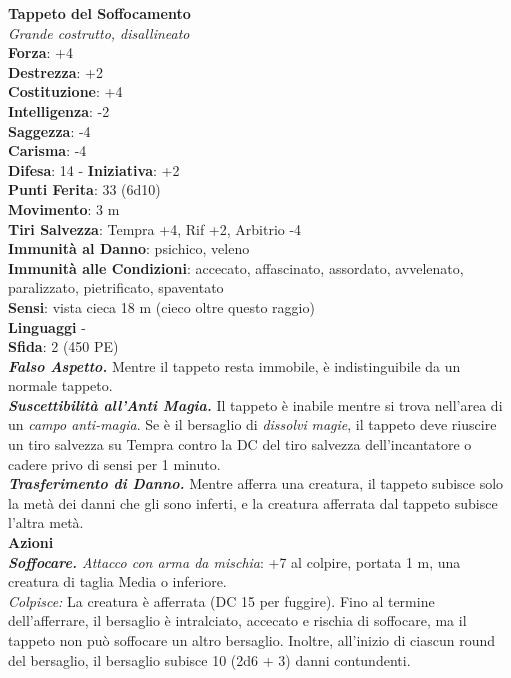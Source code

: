 \begin{multicols}{2}
\medskip\textbf{Tappeto del Soffocamento}\\
\emph{Grande costrutto, disallineato}\\
\textbf{Forza}: +4\\
\textbf{Destrezza}: +2\\
\textbf{Costituzione}: +4\\
\textbf{Intelligenza}: -2\\
\textbf{Saggezza}: -4\\
\textbf{Carisma}: -4\\
\textbf{Difesa}: 14 - \textbf{Iniziativa}: +2\\
\textbf{Punti Ferita}: 33 (6d10)\\
\textbf{Movimento}: 3 m\\
\textbf{Tiri Salvezza}: Tempra +4, Rif +2, Arbitrio -4\\
\textbf{Immunità al Danno}: psichico, veleno\\
\textbf{Immunità alle Condizioni}: accecato, affascinato, assordato, avvelenato, paralizzato, pietrificato, spaventato\\
\textbf{Sensi}: vista cieca 18 m (cieco oltre questo raggio)\\
\textbf{Linguaggi} -\\
\textbf{Sfida}: 2 (450 PE)\smallskip\\
\emph{\textbf{Falso Aspetto.}} Mentre il tappeto resta immobile, è indistinguibile da un normale tappeto.\\

\emph{\textbf{Suscettibilità all'Anti Magia.}} Il tappeto è inabile mentre si trova nell'area di un \emph{campo anti-magia}. Se è il bersaglio di \emph{dissolvi} \emph{magie}, il tappeto deve riuscire un tiro salvezza su Tempra contro la DC del tiro salvezza dell'incantatore o cadere privo di sensi per 1 minuto.\\

\emph{\textbf{Trasferimento di Danno.}} Mentre afferra una creatura, il tappeto subisce solo la metà dei danni che gli sono inferti, e la creatura afferrata dal tappeto subisce l'altra metà.\\

\smallskip\textbf{Azioni}\\

\emph{\textbf{Soffocare.} Attacco con arma da mischia}: +7 al colpire, portata 1 m, una creatura di taglia Media o inferiore.\\

\emph{Colpisce:} La creatura è afferrata (DC  15 per fuggire). Fino al termine dell'afferrare, il bersaglio è intralciato, accecato e rischia di soffocare, ma il tappeto non può soffocare un altro bersaglio. Inoltre, all'inizio di ciascun round del bersaglio, il bersaglio subisce 10 (2d6 + 3) danni contundenti. 


\end{multicols}
